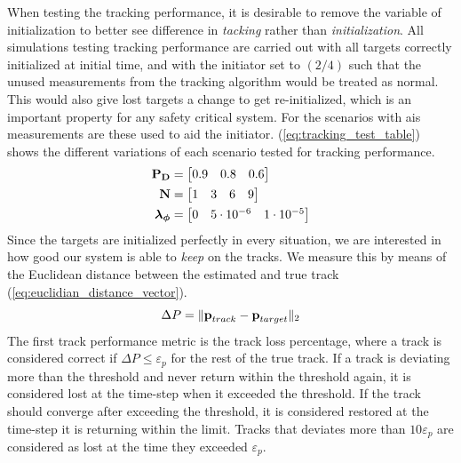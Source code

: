 When testing the tracking performance, it is desirable to remove the variable of initialization to better see difference in \emph{tacking} rather than \emph{initialization}. All simulations testing tracking performance are carried out with all targets correctly initialized at initial time, and with the initiator set to \( (2/4) \) such that the unused measurements from the tracking algorithm would be treated as normal. This would also give lost targets a change to get re-initialized, which is an important property for any safety critical system. For the scenarios with \gls{ais} measurements are these used to aid the initiator. (\ref{eq:tracking_test_table}) shows the different variations of each scenario tested for tracking performance. 
\begin{equation}\label{eq:tracking_test_table}
\begin{split}
\boldsymbol{\mathbf{P_D}} &= \begin{bmatrix} 0.9 & 0.8 & 0.6 \end{bmatrix} \\
\boldsymbol{\mathbf{N}} &= \begin{bmatrix} 1 & 3 & 6 & 9 \end{bmatrix} \\
\boldsymbol{\mathbf{\lambda_\phi}} &= \begin{bmatrix} 0 & 5\cdot10^{-6} & 1\cdot10^{-5} \end{bmatrix}
\end{split}
\end{equation}
Since the targets are initialized perfectly in every situation, we are interested in how good our system is able to \emph{keep} on the tracks. We measure this by means of the Euclidean distance between the estimated and true track (\ref{eq:euclidian_distance_vector}).
\begin{equation}
	\Delta P = \| \boldsymbol{\mathbf{p}}_{track}-\boldsymbol{\mathbf{p}}_{target} \|_2
\label{eq:euclidian_distance_vector}
\end{equation}
The first track performance metric is the track loss percentage, where a track is considered correct if \(\Delta P \leq \varepsilon_p\) for the rest of the true track. If a track is deviating more than the threshold and never return within the threshold again, it is considered lost at the time-step when it exceeded the threshold. If the track should converge after exceeding the threshold, it is considered restored at the time-step it is returning within the limit. Tracks that deviates more than \(10\varepsilon_p\) are considered as lost at the time they exceeded \(\varepsilon_p\). 

